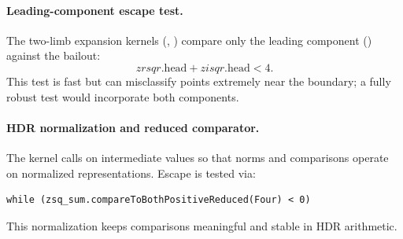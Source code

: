 \paragraph{Leading-component escape test.}
The two-limb expansion kernels (,
) compare only the leading component
() against the bailout:
\[
  zrsqr.\mathrm{head} + zisqr.\mathrm{head} < 4.
\]
This test is fast but can misclassify points extremely near the boundary; a fully
robust test would incorporate both components.

\paragraph{HDR normalization and reduced comparator.}
The  kernel calls  on intermediate
values so that norms and comparisons operate on normalized representations.
Escape is tested via:
\begin{lstlisting}
while (zsq_sum.compareToBothPositiveReduced(Four) < 0)
\end{lstlisting}
This normalization keeps comparisons meaningful and stable in HDR arithmetic.
